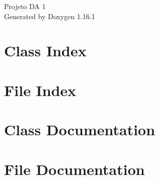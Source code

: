 \documentclass[twoside]{book}
\newcommand{\+}{\discretionary{\mbox{\scriptsize$\hookleftarrow$}}{}{}}
\newcommand{\clearemptydoublepage}{%
    \newpage{\pagestyle{empty}\cleardoublepage}%
  }
\begin{document}
  \raggedbottom
    \hypersetup{pageanchor=false,
                bookmarksnumbered=true,
                pdfencoding=unicode
               }
  \begin{titlepage}
  \vspace*{7cm}
  \begin{center}%
  {\Large Projeto DA 1}\\
  \vspace*{1cm}
  {\large Generated by Doxygen 1.16.1}\\
  \end{center}
  \end{titlepage}
  \clearemptydoublepage
  \tableofcontents
  \clearemptydoublepage
  \hypersetup{pageanchor=true}
\chapter{Class Index}

\chapter{File Index}

\chapter{Class Documentation}










\chapter{File Documentation}










  \backmatter
  \newpage
  \clearemptydoublepage
  \printindex
\end{document}
